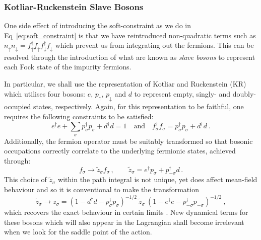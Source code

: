 \subsubsection{Kotliar-Ruckenstein Slave Bosons}

One side effect of introducing the soft-constraint as we do in Eq~\eqref{eq:soft_constraint} is that we have reintroduced non-quadratic terms such as $ n_{\uparrow} n_{\downarrow} = f^{\dagger}_{\uparrow} f^{}_{\uparrow} f^{\dagger}_{\downarrow} f^{}_{\downarrow} $ which prevent us from integrating out the fermions. This can be resolved through the introduction of what are known as \emph{slave bosons} \cite{SlaveBosons} to represent each Fock state of the impurity fermions.

In particular, we shall use the representation of Kotliar and Ruckenstein (KR) \cite{KotliarRuckenstein} which utilises four bosons: $ e $, $ p_{\uparrow} $, $ p_{\downarrow} $ and $ d $ to represent empty, singly- and doubly-occupied states, respectively. Again, for this representation to be faithful, one requires the following constraints to be satisfied:
\begin{equation}
e^{\dagger} e + \sum_{\sigma} p^{\dagger}_{\sigma} p^{}_{\sigma} + d^{\dagger} d = 1 \quad \text{and} \quad f^{\dagger}_{\sigma} f^{}_{\sigma} = p^{\dagger}_{\sigma} p^{}_{\sigma} + d^{\dagger} d ~.
\end{equation}
Additionally, the fermion operator must be suitably transformed so that bosonic  occupations correctly correlate to the underlying fermionic states, achieved through:
\begin{equation}
f^{}_{\sigma} \rightarrow \widetilde{z}^{}_{\sigma} f^{}_{\sigma}\,, \qquad \widetilde{z}_{\sigma} = e^{\dagger} p^{}_{\sigma} + p^{\dagger}_{-\sigma} d \,.
\end{equation}
This choice of $ \widetilde{z}^{}_{\sigma} $ within the path integral is not unique, yet does affect mean-field behaviour and so it is conventional to make the transformation
\begin{equation}
\widetilde{z}^{}_{\sigma} \rightarrow z^{}_{\sigma} = (1 - d^{\dagger} d - p^{\dagger}_{\sigma} p^{}_{\sigma})^{- 1 / 2} ~ \widetilde{z}^{}_{\sigma} ~ (1 - e^{\dagger} e - p^{\dagger}_{- \sigma} p^{}_{- \sigma})^{- 1 / 2} ~,
\end{equation}
which recovers the exact behaviour in certain limits \cite{SlaveBosons}. New dynamical terms for these bosons which will also appear in the Lagrangian shall become irrelevant when we look for the saddle point of the action.

